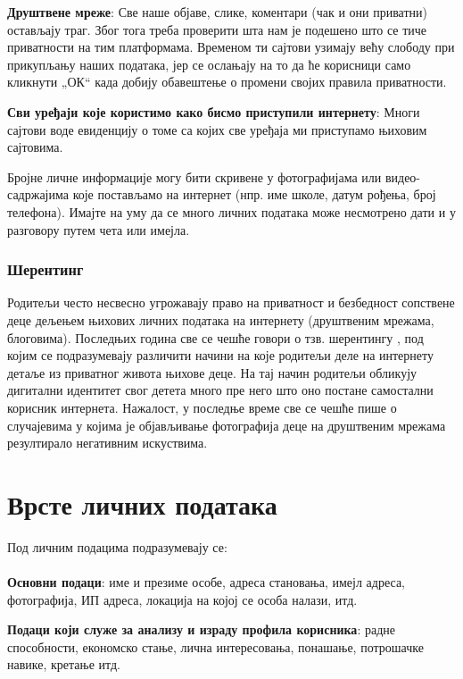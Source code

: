 \documentclass[a4paper]{article}
\begin{document}
\textbf{Друштвене мреже}:
Све наше објаве, слике, коментари (чак и они приватни) остављају траг. Због тога треба проверити шта нам је подешено што се тиче приватности на тим платформама. Временом ти сајтови узимају већу слободу при прикупљању наших података, јер се ослањају на то да ће корисници само кликнути „ОК“ када добију обавештење о промени својих правила приватности.

\textbf{Сви уређаји које користимо како бисмо приступили интернету}:
Многи сајтови воде евиденцију о томе са којих све уређаја ми приступамо њиховим сајтовима.

Бројне личне информације могу бити скривене у фотографијама или видео-садржајима које постављамо на интернет (нпр. име школе, датум рођења, број телефона). Имајте на уму да се много личних података може несмотрено дати и у разговору путем чета или имејла.
\subsubsection{Шерентинг}

Родитељи често несвесно угрожавају право на приватност и безбедност сопствене деце дељењем њихових личних података на интернету (друштвеним мрежама, блоговима). Последњих година све се чешће говори о тзв. шерентингу  \cite{sharenting}, под којим се подразумевају различити начини на које родитељи деле на интернету детаље из приватног живота њихове деце. На тај начин родитељи обликују дигитални идентитет  свог детета много пре него што оно постане самостални корисник интернета. Нажалост, у последње време све се чешће пише о случајевима у којима је објављивање фотографија деце на друштвеним мрежама резултирало негативним искуствима.
    

\section{Врсте личних података}

Под личним подацима подразумевају се:
\paragraph{}
\textbf{Основни подаци}:
име и презиме особе, адреса становања, имејл адреса, фотографија, ИП адреса, локација на којој се особа налази, итд.

\textbf{Подаци који служе за анализу и израду профила корисника}: радне способности, економско стање, лична интересовања, понашање, потрошачке навике, кретање итд.
\end{document}
